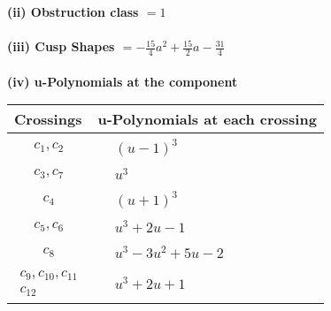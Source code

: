 \documentclass[1p]{elsarticle_modified}
\theoremstyle{definition}
\begin{document}
\flushleft \textbf{(ii) Obstruction class $= 1$}\\~\\
\flushleft \textbf{(iii) Cusp Shapes $= -\frac{15}{4} a^2+\frac{15}{2} a-\frac{31}{4}$}\\~\\
\newpage\renewcommand{\arraystretch}{1}
\flushleft \textbf{(iv) u-Polynomials at the component}\newline \\
\begin{tabular}{m{50pt}|m{274pt}}
Crossings & \hspace{64pt}u-Polynomials at each crossing \\
\hline $$\begin{aligned}c_{1},c_{2}\end{aligned}$$&$\begin{aligned}
&(u-1)^3
\end{aligned}$\\
\hline $$\begin{aligned}c_{3},c_{7}\end{aligned}$$&$\begin{aligned}
&u^3
\end{aligned}$\\
\hline $$\begin{aligned}c_{4}\end{aligned}$$&$\begin{aligned}
&(u+1)^3
\end{aligned}$\\
\hline $$\begin{aligned}c_{5},c_{6}\end{aligned}$$&$\begin{aligned}
&u^3+2 u-1
\end{aligned}$\\
\hline $$\begin{aligned}c_{8}\end{aligned}$$&$\begin{aligned}
&u^3-3 u^2+5 u-2
\end{aligned}$\\
\hline $$\begin{aligned}c_{9},c_{10},c_{11}\\c_{12}\end{aligned}$$&$\begin{aligned}
&u^3+2 u+1
\end{aligned}$\\
\hline
\end{tabular}\\~\\
\end{document}
